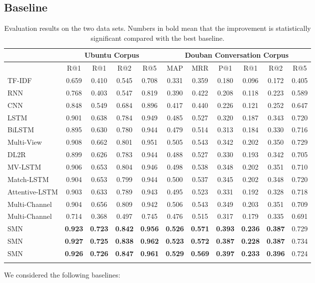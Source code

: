 \documentclass[11pt,a4paper]{article}
\newcommand{\thickhline}{\noalign{\hrule height 1pt}}
\begin{document}
	\subsection{Baseline}
	\begin{table*}[t]
		\small
		\centering
		\begin{tabular}{l|c|c|c|c|c|c|c|c|c|c}
			\thickhline &   \multicolumn{4}{c|}{\textbf{Ubuntu Corpus}}    &        \multicolumn{6}{c}{\textbf{Douban Conversation Corpus}}        \\ \hline
			&  R@1      &  R@1 &  R@2&  R@5 &MAP&MRR&P@1&  R@1 & R@2  & R@5\\ \hline
TF-IDF  & 0.659 & 0.410 & 0.545 & 0.708 & 0.331 &0.359 &0.180 & 0.096&0.172& 0.405 \\ 
			RNN  & 0.768 & 0.403 & 0.547 & 0.819 & 0.390 &0.422 &0.208&0.118&0.223&0.589\\ 
			CNN & 0.848 & 0.549 & 0.684 & 0.896 & 0.417 &0.440 &0.226&0.121&0.252&0.647\\ 
LSTM & 0.901 & 0.638 & 0.784 & 0.949 & 0.485 & 0.527 &0.320&0.187&0.343&0.720\\ 
			BiLSTM & 0.895 & 0.630 & 0.780 & 0.944 &0.479&0.514&0.313&0.184&0.330&0.716\\ \hline
			Multi-View  & 0.908 & 0.662 & 0.801 & 0.951 &0.505&0.543&0.342&0.202&0.350&0.729\\ 
DL2R  & 0.899& 0.626 & 0.783 & 0.944&0.488&0.527&0.330&0.193&0.342&0.705 \\ \hline
			MV-LSTM & 0.906& 0.653 & 0.804 & 0.946& 0.498 & 0.538 & 0.348 &0.202&0.351&0.710 \\ 
			Match-LSTM & 0.904& 0.653 & 0.799 & 0.944& 0.500& 0.537 & 0.345&0.202&0.348&0.720  \\ 
			Attentive-LSTM & 0.903& 0.633 & 0.789 & 0.943& 0.495& 0.523 & 0.331&0.192&0.328&0.718  \\ 
			Multi-Channel & 0.904& 0.656 & 0.809 & 0.942& 0.506 & 0.543 & 0.349 &0.203&0.351&0.709 \\  
			Multi-Channel& 0.714& 0.368 & 0.497 & 0.745& 0.476 & 0.515 & 0.317 &0.179&0.335&0.691\\ \hline
SMN & \textbf{0.923} & \textbf{0.723} & \textbf{0.842} & \textbf{0.956} &\textbf{0.526}&\textbf{0.571}&\textbf{0.393}&\textbf{0.236}&\textbf{0.387}&0.729\\
			SMN & \textbf{0.927} & \textbf{0.725} & \textbf{0.838} & \textbf{0.962} &\textbf{0.523}&\textbf{0.572}& \textbf{0.387}&\textbf{0.228}&\textbf{0.387}&0.734\\
			SMN & \textbf{0.926} & \textbf{0.726} & \textbf{0.847} & \textbf{0.961} &\textbf{0.529}&\textbf{0.569}&\textbf{0.397}&\textbf{0.233}&\textbf{0.396}&0.724\\
			\thickhline
		\end{tabular}

		\caption{Evaluation results on the two data sets. Numbers in bold mean that the improvement is statistically significant compared with the best baseline. 
		}		\label{exp:response} \vspace{-5mm}	
	\end{table*}
	We considered the following baselines:
	
\end{document}
